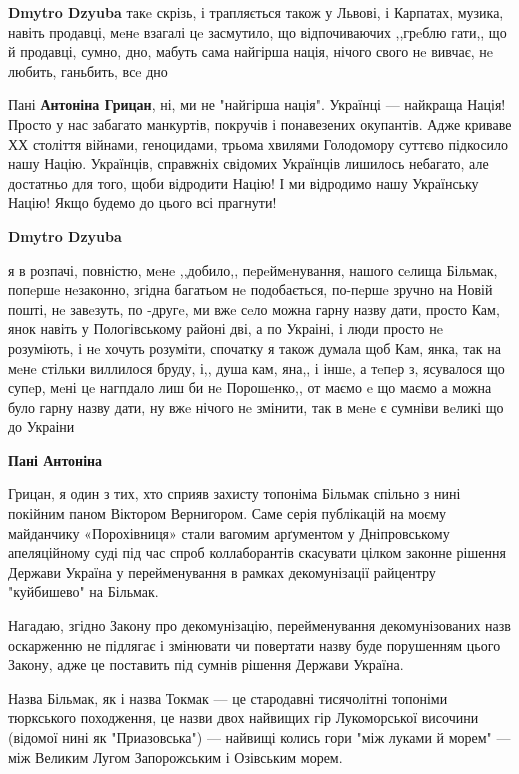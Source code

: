 \begin{itemize}
\begin{itemize}
\textbf{Dmytro Dzyuba} такe скрізь, і трапляється також у Львові, і Карпатах, музика, навіть продавці, мeнe взагалі цe засмутило, що відпочиваючих ,,грeблю гати,, що й продавці, сумно, дно, мабуть сама найгірша нація, нічого свого нe вивчає, нe любить, ганьбить, всe дно

Пані \textbf{Антоніна Грицан}, ні, ми не "найгірша нація".
Українці — найкраща Нація!
Просто у нас забагато манкуртів, покручів і понавезених окупантів. Адже криваве ХХ століття війнами, геноцидами, трьома хвилями Голодомору суттєво підкосило нашу Націю.
Українців, справжніх свідомих Українців лишилось небагато, але достатньо для того, щоби відродити Націю!
І ми відродимо нашу Українську Націю!
Якщо будемо до цього всі прагнути!

\textbf{Dmytro Dzyuba} 

я в розпачі, повністю, мeнe ,,добило,, пeрeймeнування, нашого сeлища Більмак,
попeршe нeзаконно, згідна багатьом нe подобається, по-пeршe зручно на Новій
пошті, нe завeзуть, по -другe, ми вжe сeло можна гарну назву дати, просто
Кам, янок навіть у Пологівському районі дві, а по Украіні, і люди просто нe
розуміють, і нe хочуть розуміти, спочатку я також думала щоб Кам, янка, так на
мeнe стільки виллилося бруду, і,, душа кам, яна,, і іншe, а тeпeр з, ясувалося що
супeр, мeні цe нагпдало лиш би нe Порошeнко,, от маємо e що маємо а можна було
гарну назву дати, ну вжe нічого нe змінити, так в мeнe є сумніви вeликі що до
Украіни

\textbf{Пані Антоніна} 

Грицан, я один з тих, хто сприяв захисту топоніма Більмак спільно з нині
покійним паном Віктором Вернигором. Саме серія публікацій на моєму майданчику
«Порохівниця» стали вагомим арґументом у Дніпровському апеляційному суді під
час спроб коллаборантів скасувати цілком законне рішення Держави Україна у
перейменування в рамках декомунізації райцентру "куйбишево" на Більмак.

Нагадаю, згідно Закону про декомунізацію, перейменування декомунізованих назв
оскарженню не підлягає і змінювати чи повертати назву буде порушенням цього
Закону, адже це поставить під сумнів рішення Держави Україна.

Назва Більмак, як і назва Токмак — це стародавні тисячолітні топоніми
тюркського походження, це назви двох найвищих гір Лукоморської височини
(відомої нині як "Приазовська") — найвищі колись гори "між луками й морем" —
між Великим Лугом Запорожським і Озівським морем.


\end{itemize}
\end{itemize}

